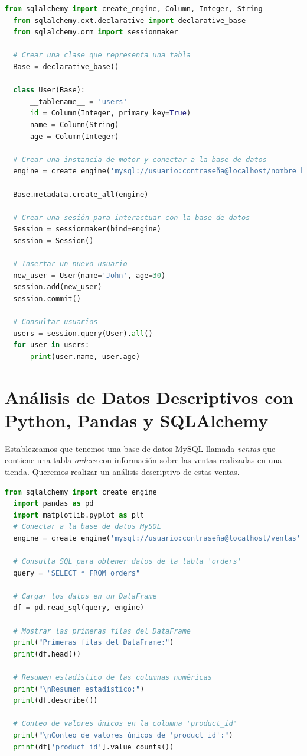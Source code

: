 \documentclass[12pt]{article}
\begin{document}
\begin{lstlisting}[language=Python]
  from sqlalchemy import create_engine, Column, Integer, String
  from sqlalchemy.ext.declarative import declarative_base
  from sqlalchemy.orm import sessionmaker

  # Crear una clase que representa una tabla
  Base = declarative_base()

  class User(Base):
      __tablename__ = 'users'
      id = Column(Integer, primary_key=True)
      name = Column(String)
      age = Column(Integer)

  # Crear una instancia de motor y conectar a la base de datos
  engine = create_engine('mysql://usuario:contraseña@localhost/nombre_base_de_datos', echo=True)

  Base.metadata.create_all(engine)

  # Crear una sesión para interactuar con la base de datos
  Session = sessionmaker(bind=engine)
  session = Session()

  # Insertar un nuevo usuario
  new_user = User(name='John', age=30)
  session.add(new_user)
  session.commit()

  # Consultar usuarios
  users = session.query(User).all()
  for user in users:
      print(user.name, user.age)

\end{lstlisting}

\section{Análisis de Datos Descriptivos con Python, Pandas y SQLAlchemy}

Establezcamos que tenemos una base de datos MySQL llamada \textit{ventas} que contiene una tabla \textit{orders} con información sobre las ventas realizadas en una tienda. Queremos realizar un análisis descriptivo de estas ventas.

\begin{lstlisting}[language=Python]
  from sqlalchemy import create_engine
  import pandas as pd
  import matplotlib.pyplot as plt
  # Conectar a la base de datos MySQL
  engine = create_engine('mysql://usuario:contraseña@localhost/ventas')

  # Consulta SQL para obtener datos de la tabla 'orders'
  query = "SELECT * FROM orders"

  # Cargar los datos en un DataFrame
  df = pd.read_sql(query, engine)

  # Mostrar las primeras filas del DataFrame
  print("Primeras filas del DataFrame:")
  print(df.head())

  # Resumen estadístico de las columnas numéricas
  print("\nResumen estadístico:")
  print(df.describe())

  # Conteo de valores únicos en la columna 'product_id'
  print("\nConteo de valores únicos de 'product_id':")
  print(df['product_id'].value_counts())

\end{lstlisting}
\end{document}
